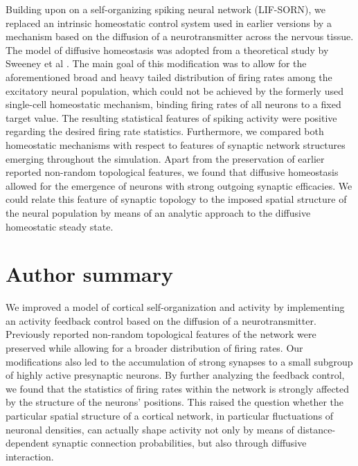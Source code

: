\documentclass[10pt,letterpaper]{article}
\begin{document}
Building upon on a self-organizing spiking neural network (LIF-SORN), we replaced an intrinsic homeostatic control system used in earlier versions by a mechanism based on the diffusion of a neurotransmitter across the nervous tissue. The model of diffusive homeostasis was adopted from a theoretical study by Sweeney et al \cite{Sweeney_Paper}. The main goal of this modification was to allow for the aforementioned broad and heavy tailed distribution of firing rates among the excitatory neural population, which could not be achieved by the formerly used single-cell homeostatic mechanism, binding firing rates of all neurons to a fixed target value. The resulting statistical features of spiking activity were positive regarding the desired firing rate statistics. Furthermore, we compared both homeostatic mechanisms with respect to features of synaptic network structures emerging throughout the simulation. Apart from the preservation of earlier reported non-random topological features, we found that diffusive homeostasis allowed for the emergence of neurons with strong outgoing synaptic efficacies. We could relate this feature of synaptic topology to the imposed spatial structure of the neural population by means of an analytic approach to the diffusive homeostatic steady state.

\section*{Author summary}
We improved a model of cortical self-organization and activity by implementing an activity feedback control based on the diffusion of a neurotransmitter. Previously reported non-random topological features of the network were preserved while allowing for a broader distribution of firing rates. Our modifications also led to the accumulation of strong synapses to a small subgroup of highly active presynaptic neurons. By further analyzing the feedback control, we found that the statistics of firing rates within the network is strongly affected by the structure of the neurons' positions. This raised the question whether the particular spatial structure of a cortical network, in particular fluctuations of neuronal densities, can actually shape activity not only by means of distance-dependent synaptic connection probabilities, but also through diffusive interaction.  
\end{document}
